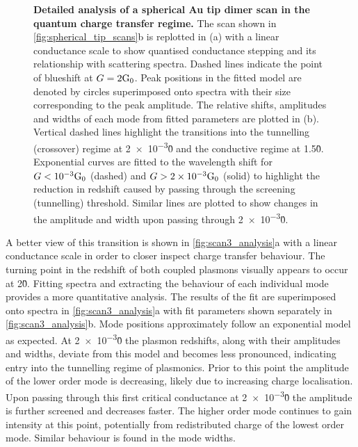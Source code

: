 \documentclass[a4paper, 11pt]{article}
\begin{document}
\begin{figure}[bt]
\caption[Detailed analysis of a spherical Au tip dimer scan in the quantum charge transfer regime]{\textbf{Detailed analysis of a spherical Au tip dimer scan in the quantum charge transfer regime.} The scan shown in \autoref{fig:spherical_tip_scans}b is replotted in (a) with a linear conductance scale to show quantised conductance stepping and its relationship with scattering spectra. Dashed lines indicate the point of blueshift at $G=2\mathrm{G_{0}}$. Peak positions in the fitted model are denoted by circles superimposed onto spectra with their size corresponding to the peak amplitude. The relative shifts, amplitudes and widths of each mode from fitted parameters are plotted in (b). Vertical dashed lines highlight the transitions into the tunnelling (crossover) regime at \num{2e-3}\G0 and the conductive regime at 1.5\G0. Exponential curves are fitted to the wavelength shift for $G<\num{e-3}\mathrm{G_{0}}$ (dashed) and $G>\num{2e-3}\mathrm{G_{0}}$ (solid) to highlight the reduction in redshift caused by passing through the screening (tunnelling) threshold. Similar lines are plotted to show changes in the amplitude and width upon passing through \num{2e-3}\G0.}
\label{fig:scan3_analysis}
\vspace{-5pt}
\end{figure}

A better view of this transition is shown in \autoref{fig:scan3_analysis}a with a linear conductance scale in order to closer inspect charge transfer behaviour. The turning point in the redshift of both coupled plasmons visually appears to occur at 2\G0. Fitting spectra and extracting the behaviour of each individual mode provides a more quantitative analysis. The results of the fit are superimposed onto spectra in \autoref{fig:scan3_analysis}a with fit parameters shown separately in \autoref{fig:scan3_analysis}b. Mode positions approximately follow an exponential model as expected. At \num{2e-3}\G0 the plasmon redshifts, along with their amplitudes and widths, deviate from this model and becomes less pronounced, indicating entry into the tunnelling regime of plasmonics. Prior to this point the amplitude of the lower order mode is decreasing, likely due to increasing charge localisation. Upon passing through this first critical conductance at \num{2e-3}\G0 the amplitude is further screened and decreases faster. The higher order mode continues to gain intensity at this point, potentially from redistributed charge of the lowest order mode. Similar behaviour is found in the mode widths.
\end{document}
